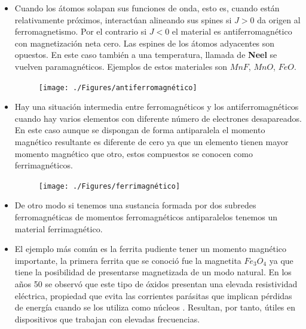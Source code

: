 \begin{itemize}
	\item Cuando los átomos solapan sus funciones de onda, esto es, cuando están relativamente próximos, interactúan alineando sus spines si $J>0$ da origen al ferromagnetismo. Por el contrario si $J<0$  el material es antiferromagnético con magnetización neta cero. Las espines de los átomos adyacentes son opuestos. En este caso también a una temperatura, llamada de \textbf{Neel} se vuelven paramagnéticos. Ejemplos de estos materiales son $MnF$, $MnO$, $FeO$.
	
	\begin{figure}[H]
    \hspace{4.0cm}
    \texttt{[image: ./Figures/antiferromagnético]}
	\label{fig:antiferromagnético}
	\end{figure}
	
	
	\item Hay una situación intermedia entre ferromagnéticos y los antiferromagnéticos cuando hay varios elementos con diferente número de electrones desapareados. En este caso aunque se dispongan de forma antiparalela el momento magnético resultante es diferente de cero ya que un elemento tienen mayor momento magnético que otro, estos compuestos se conocen como ferrimagnéticos.
	
	
	\begin{figure}[H]
    \hspace{4.0cm}
    \texttt{[image: ./Figures/ferrimagnético]}
	\label{fig:ferrimagnético}
	\end{figure}
	
	
	\item De otro modo si tenemos una sustancia formada por dos subredes ferromagnéticas de momentos ferromagnéticos antiparalelos tenemos un material ferrimagnético.
	
	\item El ejemplo más común es la ferrita pudiente tener un momento magnético importante, la primera ferrita que se conoció fue la magnetita $Fe_{3}O_{4}$ ya que tiene la posibilidad de presentarse magnetizada de un modo natural. En los años 50 se observó que este tipo de óxidos presentan una elevada resistividad eléctrica, propiedad que evita las corrientes parásitas que implican pérdidas de energía cuando se los utiliza como núcleos . Resultan, por tanto, útiles en dispositivos que trabajan con elevadas frecuencias.

\end{itemize}

